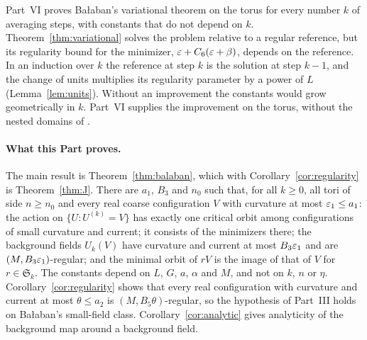 \label{intro:VI}
Part~VI proves Ba\l aban's variational theorem on the torus for every number $k$ of averaging steps, with constants that do not depend on $k$. Theorem~\ref{thm:variational} solves the problem relative to a regular reference, but its regularity bound for the minimizer, $\varepsilon+C_6(\varepsilon+\beta)$, depends on the reference. In an induction over $k$ the reference at step $k$ is the solution at step $k-1$, and the change of units multiplies its regularity parameter by a power of $L$ (Lemma~\ref{lem:units}). Without an improvement the constants would grow geometrically in $k$. Part~VI supplies the improvement on the torus, without the nested domains of \cite[Sect.~F]{BalVar}.

\paragraph{What this Part proves.} The main result is Theorem~\ref{thm:balaban}, which with Corollary~\ref{cor:regularity} is Theorem~\ref{thm:J}. There are $a_1$, $B_3$ and $n_0$ such that, for all $k\ge0$, all tori of side $n\ge n_0$ and every real coarse configuration $V$ with curvature at most $\varepsilon_1\le a_1$: the action on $\{U:U^{(k)}=V\}$ has exactly one critical orbit among configurations of small curvature and current; it consists of the minimizers there; the background fields $U_k(V)$ have curvature and current at most $B_3\varepsilon_1$ and are $(M,B_3\varepsilon_1)$-regular; and the minimal orbit of $rV$ is the image of that of $V$ for $r\in\mathfrak S_k$. The constants depend on $L$, $G$, $a$, $\alpha$ and $M$, and not on $k$, $n$ or $\eta$. Corollary~\ref{cor:regularity} shows that every real configuration with curvature and current at most $\theta\le a_2$ is $(M,B_5\theta)$-regular, so the hypothesis of Part~III holds on Ba\l aban's small-field class. Corollary~\ref{cor:analytic} gives analyticity of the background map around a background field.

